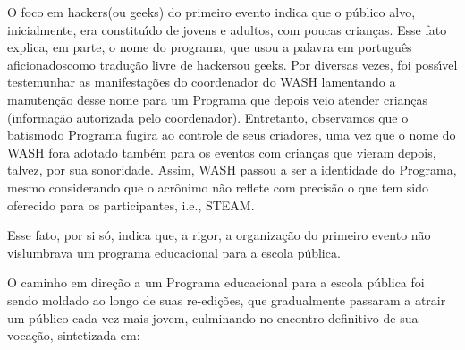 \documentclass[
12pt,		%
openright,	%
twoside,  %
a4paper,			%
chapter=TITLE,		%
english,			%
french,				%
spanish,			%
brazil				%
]{USPSC-classe/USPSC}
\begin{document}
O foco em \textquotedbl hackers\textquotedbl  (ou \textquotedbl geeks\textquotedbl ) do primeiro evento indica que o p\'ublico alvo, inicialmente, era constitu\'{\i}do de jovens e adultos, com  poucas crian\c{c}as. Esse fato explica, em parte, o nome do programa, que usou a palavra em portugu\^es \textquotedbl aficionados\textquotedbl  como tradu\c{c}\~ao livre de \textquotedbl hackers\textquotedbl  ou \textquotedbl geeks\textquotedbl . Por diversas vezes, foi poss\'{\i}vel testemunhar as manifesta\c{c}\~oes do coordenador do WASH lamentando a manuten\c{c}\~ao desse nome para um Programa que depois veio atender crian\c{c}as (informa\c{c}\~ao autorizada pelo coordenador). Entretanto, observamos que o \textquotedbl batismo\textquotedbl  do Programa fugira ao controle de seus criadores, uma vez que o nome do WASH fora adotado tamb\'em para os eventos com crian\c{c}as que vieram depois, talvez, por sua sonoridade. Assim, \textquotedbl  WASH \textquotedbl  passou a ser a identidade do Programa, mesmo considerando que o acr\^onimo n\~ao reflete com precis\~ao o que tem sido oferecido para os participantes, i.e., STEAM.

















Esse fato, por si s\'o, indica que, a rigor, a organiza\c{c}\~ao do primeiro evento n\~ao vislumbrava um programa educacional para a escola p\'ublica.

















O caminho em dire\c{c}\~ao a um Programa educacional para a escola p\'ublica foi sendo moldado ao longo de suas re-edi\c{c}\~oes, que gradualmente passaram a atrair um p\'ublico cada vez mais jovem, culminando no encontro definitivo de sua voca\c{c}\~ao, sintetizada em:
\end{document}
